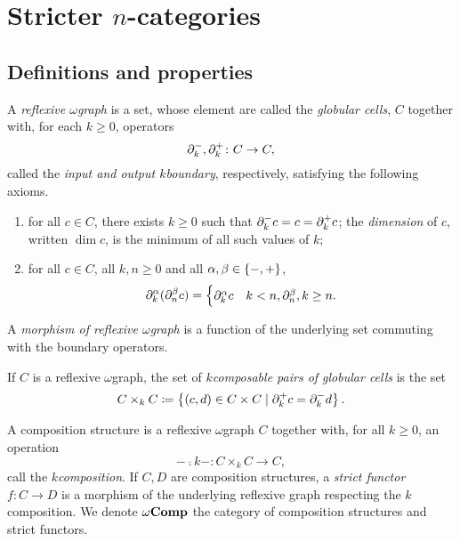 \section{Stricter \texorpdfstring{$n$}{n}-categories}

\subsection{Definitions and properties}

\begin{dfn} 
    A \emph{reflexive \( \omega \)\nbd graph} is a set, whose element are called the \emph{globular cells}, \( C \) together with, for each \( k \geq 0 \), operators
    \begin{equation*}
        \partial_{k}^{-}, \partial_{k}^{+} \colon C \to C,
    \end{equation*}
    called the \emph{input and output \( k \)\nbd boundary}, respectively, satisfying the following axioms.
    \begin{enumerate}
        \item for all \( c \in C \), there exists \( k \geq 0 \) such that \( \partial_{k}^{-} c = c = \partial_{k}^{+} c \); the \emph{dimension} of \( c \), written \( \dim c \), is the minimum of all such values of \( k \);
        \item for all \( c \in C \), all \( k, n \geq 0 \) and all \( \alpha, \beta \in \left\{ {-, +} \right\} \),
        \begin{equation*}
            \partial_{k}^{\alpha}(\partial_{n}^{\beta} c) = 
            \begin{cases}
                \partial_{k}^{\alpha} c & k < n,
                \partial_{n}^{\beta}, k \ge n.
            \end{cases}
        \end{equation*}
    \end{enumerate}
    A \emph{morphism of reflexive \( \omega \)\nbd graph} is a function of the underlying set commuting with the boundary operators.
\end{dfn}

\noindent If \( C \) is a reflexive \( \omega \)\nbd graph, the set of \emph{\( k \)\nbd composable pairs of globular cells} is the set 
\begin{equation*}
    C \times_k C \coloneqq \left\{ {(c, d) \in C \times C \mid \partial_{k}^{+} c = \partial_{k}^{-} d} \right\}.
\end{equation*}

\begin{dfn} 
    A composition structure is a reflexive \( \omega \)\nbd graph \( C \) together with, for all \( k \geq 0 \), an operation
    \begin{equation*}
        - \comp{k} - \colon C \times_k C \to C,
    \end{equation*}
    call the \emph{\( k \)\nbd composition}.
    If \( C, D \) are composition structures, a \emph{strict functor} \( f \colon C \to D \) is a morphism of the underlying reflexive graph respecting the \( k \)\nbd composition.
    We denote \( \omega\mathbf{Comp} \) the category of composition structures and strict functors.
\end{dfn}

